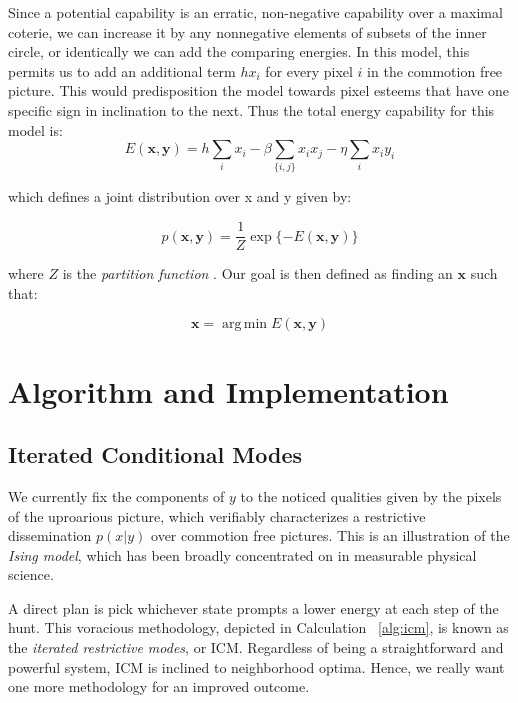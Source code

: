 \documentclass[conference]{IEEEtran}
\begin{document}
Since a potential capability is an erratic, non-negative capability over a maximal coterie, we can increase it by any nonnegative elements of subsets of the inner circle, or identically we can add the comparing energies. In this model, this permits us to add an additional term $hx_i$ for every pixel $i$ in the commotion free picture. This would predisposition the model towards pixel esteems that have one specific sign in inclination to the next. Thus the total energy capability for this model is:
$$
E(\mathbf{x}, \mathbf{y}) = h \sum_{i}x_i - \beta\sum_{\{i, j\}}x_ix_j - \eta\sum_{i}x_iy_i
$$

which defines a joint distribution over x and y given by:

$$
p(\mathbf{x}, \mathbf{y}) = \frac{1}{Z}\exp\{-E(\mathbf{x}, \mathbf{y})\}
$$

where $Z$ is the \textit{partition function} \cite{bishop2006pattern}. Our goal is then defined as finding an $\mathbf{x}$ such that:

$$
\mathbf{x} = {\operatorname{arg\,min}} E(\mathbf{x}, \mathbf{y})
$$

\section{Algorithm and Implementation}
\vspace{1em}
\subsection{Iterated Conditional Modes}
We currently fix the components of $y$ to the noticed qualities given by the pixels of the uproarious picture, which verifiably characterizes a restrictive dissemination $p(x|y)$ over commotion free pictures. This is an illustration of the \textit{Ising model}, which has been broadly concentrated on in measurable physical science.


A direct plan is pick whichever state prompts a lower energy at each step of the hunt. This voracious methodology, depicted in Calculation ~\ref{alg:icm}, is known as the \textit{iterated restrictive modes}, or ICM. Regardless of being a straightforward and powerful system, ICM is inclined to neighborhood optima. Hence, we really want one more methodology for an improved outcome.
\end{document}

